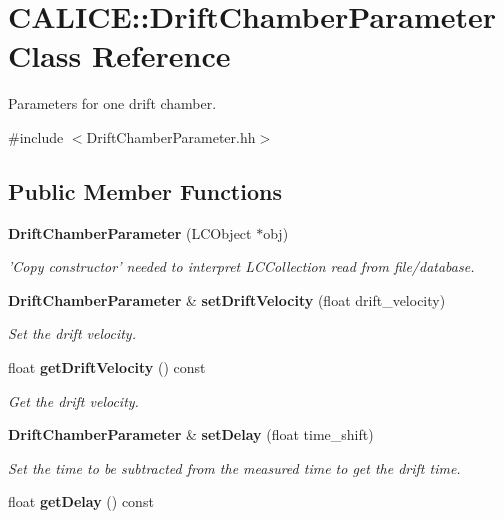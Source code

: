 \section{CALICE::DriftChamberParameter Class Reference}
\label{classCALICE_1_1DriftChamberParameter}


Parameters for one drift chamber.  


{\ttfamily \#include $<$DriftChamberParameter.hh$>$}\subsection*{Public Member Functions}
\begin{DoxyCompactItemize}
\item 
{\bf DriftChamberParameter} (LCObject $\ast$obj)\label{classCALICE_1_1DriftChamberParameter_ac3f7e30c5f70454126342fe3e192c1be}

\begin{DoxyCompactList}\small\item\em 'Copy constructor' needed to interpret LCCollection read from file/database. \item\end{DoxyCompactList}\item 
{\bf DriftChamberParameter} \& {\bf setDriftVelocity} (float drift\_\-velocity)\label{classCALICE_1_1DriftChamberParameter_a72ca0c60cfa34e730a99b8ebb557021f}

\begin{DoxyCompactList}\small\item\em Set the drift velocity. \item\end{DoxyCompactList}\item 
float {\bf getDriftVelocity} () const \label{classCALICE_1_1DriftChamberParameter_a478ffb65ebfcdba16139529f2f19ec72}

\begin{DoxyCompactList}\small\item\em Get the drift velocity. \item\end{DoxyCompactList}\item 
{\bf DriftChamberParameter} \& {\bf setDelay} (float time\_\-shift)\label{classCALICE_1_1DriftChamberParameter_a6a0f492d3b1cb14da314e777fd5796c9}

\begin{DoxyCompactList}\small\item\em Set the time to be subtracted from the measured time to get the drift time. \item\end{DoxyCompactList}\item 
float {\bf getDelay} () const \label{classCALICE_1_1DriftChamberParameter_af6f6db7b63df194db0ada6c041a3da79}


\end{DoxyCompactItemize}
